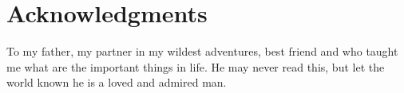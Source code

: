 
\section*{Acknowledgments}

To my father, my partner in my wildest adventures, best friend and who taught me what are the important things in life. He may never read this, but let the world known he is a loved and admired man.


